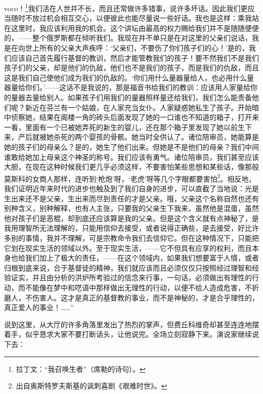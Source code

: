 voco！\footnote{拉丁文：“我召唤生者”（席勒的诗句）。}我们活在人世并不长，而且还常做许多错事，说许多坏话。因此我们更应当随时不放过机会相互交心，以便彼此也能尽量说一些好话。我也是这样：乘我站在这里时，我应该利用我的机会。这个讲坛由最高的权力赐给我们并不是随随便便的，——整个俄罗斯都在倾听我们。我现在并不单只是在对这里的父亲们说话，我是在向世上所有的父亲大声疾呼：‘父亲们，不要伤了你们孩子们的心！’是的，我们应该自己首先履行基督的教训，然后才能管教我们的孩子！要不然我们不是我们孩子们的父亲，却是他们的仇敌，他们也不是我们的孩子，而是我们的仇敌，而且这是我们自己使他们成为我们的仇敌的。‘你们用什么量器量给人，也必用什么量器量给你们。’——这话不是我说的，那是福音书给我们的教训：应该用人家量给你的量器去量给别人。如果孩子们用我们的量器照样量还给我们，我们怎么能责备他们呢？新近在芬兰有一个姑娘，在人家充当女仆。人家疑惑她私生了孩子。开始暗中侦察她，结果在阁楼一角的砖头后面发现了她的一口谁也不知道的箱子，打开来一看，里面有一个已被她弄死的新生的婴儿，还在那个箱子里发现了她以前生下来，产后就被她杀死的两个婴孩的骨骸。她当时全供认了。诸位陪审员，她能算是她的孩子们的母亲么？是的，她生了他们出来。但她是不是他们的母亲？我们中间谁敢给她加上母亲这个神圣的称号。我们应该有勇气。诸位陪审员，我们甚至应该大胆，在现在这种时候我们更几乎必须这样，不要害怕某些思想和某些话，像那般莫斯科的女商人那样，连听到‘枪炮’呀，‘老虎’呀等几个字眼都要害怕\footnote{出自奥斯特罗夫斯基的讽刺喜剧《艰难时世》。}。相反地，我们证明近年来时代的进步也触及到了我们自身的进步，可以直截了当地说：光是生出来还不是父亲，生出来而尽到责任的才是父亲。哦，父亲这个名称自然也还有别种含义，别种解释，也有人主张，只要我的父亲生下我来，虽然他是混蛋，虽然他对孩子们是恶棍，却到底还应该算是我的父亲。但是这个含义就有点神秘了，是我用理智所无法理解的，只能用信仰去接受，或者说得正确些，是去接受，好比许多别的事情，我并不理解，可是宗教命令我们去信仰它。但在这种情况下，只能把它划在现实生活的领域以外。至于现实生活，——它不但具有应享的权利，而且本身也给我们加上了极大的责任，——在这个领域内，如果我们想要富于人情，或者归根到底来说，合于基督徒的精神，我们就应该而且必须仅仅只按照经过理智和经验证实，并且由分析的洪炉所考验过的信念来行事，一句话，必须做出有理性的行动，而不能像在梦中和呓语中那样做出无理性的行动，以便不给人造成危害，不折磨人，不伤害人。这才是真正的基督教的事业，而不是神秘的，才是合乎理性的，真正爱人的事业！……”
\par 说到这里，从大厅的许多角落里发出了热烈的掌声，但费丘科维奇却甚至连连地摆着手，似乎恳求大家不要打断话头，让他说完。全场立刻寂静下来。演说家继续说下去：
